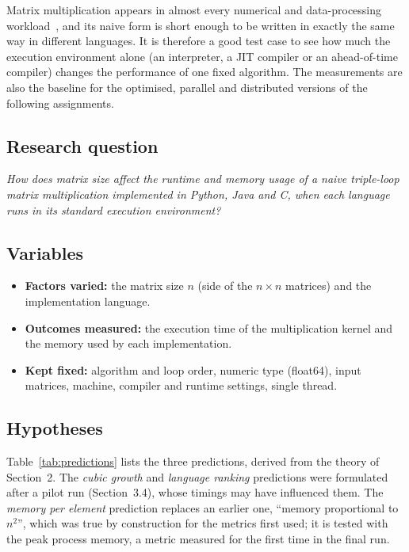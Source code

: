 \documentclass[12pt,a4paper]{article}
\begin{document}
Matrix multiplication appears in almost every numerical and data-processing
workload~\cite{cormen2009}, and its naive form is short enough to be written in exactly
the same way in different languages. It is therefore a good test case to see how much
the execution environment alone (an interpreter, a JIT compiler or an ahead-of-time
compiler) changes the performance of one fixed algorithm. The measurements are also the
baseline for the optimised, parallel and distributed versions of the following
assignments.

\subsection{Research question}

\begin{center}
\begin{minipage}{0.88\textwidth}
\itshape How does matrix size affect the runtime and memory usage of a naive triple-loop
matrix multiplication implemented in Python, Java and C, when each language runs in its
standard execution environment?
\end{minipage}
\end{center}

\subsection{Variables}

\begin{itemize}
    \item \textbf{Factors varied:} the matrix size $n$ (side of the $n \times n$
    matrices) and the implementation language.
    \item \textbf{Outcomes measured:} the execution time of the multiplication kernel and
    the memory used by each implementation.
    \item \textbf{Kept fixed:} algorithm and loop order, numeric type (float64), input
    matrices, machine, compiler and runtime settings, single thread.
\end{itemize}

\subsection{Hypotheses}

Table~\ref{tab:predictions} lists the three predictions, derived from the theory of
Section~2. The \textit{cubic growth} and \textit{language ranking} predictions were
formulated after a pilot run (Section~3.4), whose timings may have influenced them. The
\textit{memory per element} prediction replaces an earlier one, ``memory proportional to
$n^2$'', which was true by construction for the metrics first used; it is tested with
the peak process memory, a metric measured for the first time in the final run.
\end{document}
